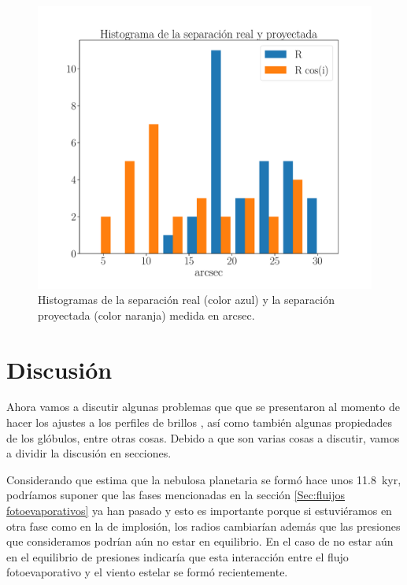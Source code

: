 \documentclass{book}
\begin{document}
\begin{figure}[htb]
    \centering
    \includegraphics[width=\textwidth]{ultimos/Hist_seprarcion(1).pdf}
    \caption{Histogramas de la separación real (color azul) y la separación proyectada (color naranja) medida en arcsec.}
    \label{fig:hist_sep_ryp}
\end{figure}


\chapter{Discusión}\label{Chp:conclusiones}

Ahora vamos a discutir algunas problemas que que se presentaron al momento de hacer los ajustes a los perfiles de brillos , así como también algunas propiedades de los glóbulos, entre otras cosas. Debido a que son varias cosas a discutir, vamos a dividir la discusión en secciones.

Considerando que \cite{Zavala:2022} estima que la nebulosa planetaria se formó hace unos \SI{11.8}{kyr}, podríamos suponer que las fases mencionadas en la sección \ref{Sec:fluijos fotoevaporativos} ya han pasado y esto es importante porque si estuviéramos en otra fase como en la de implosión, los radios cambiarían además que las presiones que consideramos podrían aún no estar en equilibrio. En el caso de no estar aún en el equilibrio de presiones indicaría que esta interacción entre el flujo fotoevaporativo y el viento estelar se formó recientemente.\\
\end{document}
